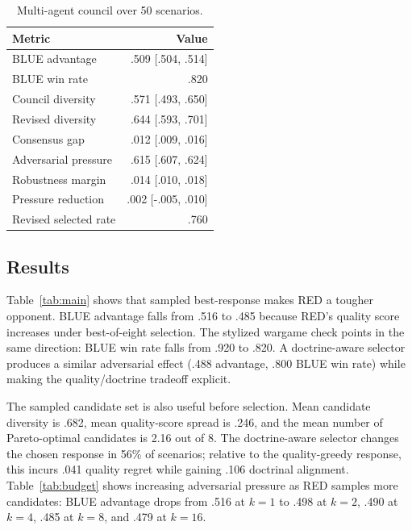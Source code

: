 \documentclass[sigconf]{acmart}
\begin{document}
\begin{table}[t]
\caption{Multi-agent council over 50 scenarios.}
\label{tab:council}
\small
\begin{tabular}{lr}
\toprule
Metric & Value \\
\midrule
BLUE advantage & .509 [.504, .514] \\
BLUE win rate & .820 \\
Council diversity & .571 [.493, .650] \\
Revised diversity & .644 [.593, .701] \\
Consensus gap & .012 [.009, .016] \\
Adversarial pressure & .615 [.607, .624] \\
Robustness margin & .014 [.010, .018] \\
Pressure reduction & .002 [-.005, .010] \\
Revised selected rate & .760 \\
\bottomrule
\end{tabular}
\end{table}

\subsection{Results}

Table~\ref{tab:main} shows that sampled best-response makes RED a tougher opponent. BLUE advantage falls from .516 to .485 because RED's quality score increases under best-of-eight selection. The stylized wargame check points in the same direction: BLUE win rate falls from .920 to .820. A doctrine-aware selector produces a similar adversarial effect (.488 advantage, .800 BLUE win rate) while making the quality/doctrine tradeoff explicit.

The sampled candidate set is also useful before selection. Mean candidate diversity is .682, mean quality-score spread is .246, and the mean number of Pareto-optimal candidates is 2.16 out of 8. The doctrine-aware selector changes the chosen response in 56\% of scenarios; relative to the quality-greedy response, this incurs .041 quality regret while gaining .106 doctrinal alignment. Table~\ref{tab:budget} shows increasing adversarial pressure as RED samples more candidates: BLUE advantage drops from .516 at $k=1$ to .498 at $k=2$, .490 at $k=4$, .485 at $k=8$, and .479 at $k=16$.
\end{document}
